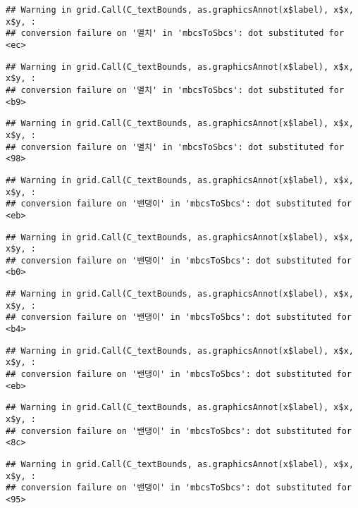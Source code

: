 \documentclass[
]{article}
\begin{document}
\begin{verbatim}
## Warning in grid.Call(C_textBounds, as.graphicsAnnot(x$label), x$x, x$y, :
## conversion failure on '멸치' in 'mbcsToSbcs': dot substituted for <ec>
\end{verbatim}

\begin{verbatim}
## Warning in grid.Call(C_textBounds, as.graphicsAnnot(x$label), x$x, x$y, :
## conversion failure on '멸치' in 'mbcsToSbcs': dot substituted for <b9>
\end{verbatim}

\begin{verbatim}
## Warning in grid.Call(C_textBounds, as.graphicsAnnot(x$label), x$x, x$y, :
## conversion failure on '멸치' in 'mbcsToSbcs': dot substituted for <98>
\end{verbatim}

\begin{verbatim}
## Warning in grid.Call(C_textBounds, as.graphicsAnnot(x$label), x$x, x$y, :
## conversion failure on '밴댕이' in 'mbcsToSbcs': dot substituted for <eb>
\end{verbatim}

\begin{verbatim}
## Warning in grid.Call(C_textBounds, as.graphicsAnnot(x$label), x$x, x$y, :
## conversion failure on '밴댕이' in 'mbcsToSbcs': dot substituted for <b0>
\end{verbatim}

\begin{verbatim}
## Warning in grid.Call(C_textBounds, as.graphicsAnnot(x$label), x$x, x$y, :
## conversion failure on '밴댕이' in 'mbcsToSbcs': dot substituted for <b4>
\end{verbatim}

\begin{verbatim}
## Warning in grid.Call(C_textBounds, as.graphicsAnnot(x$label), x$x, x$y, :
## conversion failure on '밴댕이' in 'mbcsToSbcs': dot substituted for <eb>
\end{verbatim}

\begin{verbatim}
## Warning in grid.Call(C_textBounds, as.graphicsAnnot(x$label), x$x, x$y, :
## conversion failure on '밴댕이' in 'mbcsToSbcs': dot substituted for <8c>
\end{verbatim}

\begin{verbatim}
## Warning in grid.Call(C_textBounds, as.graphicsAnnot(x$label), x$x, x$y, :
## conversion failure on '밴댕이' in 'mbcsToSbcs': dot substituted for <95>
\end{verbatim}
\end{document}
